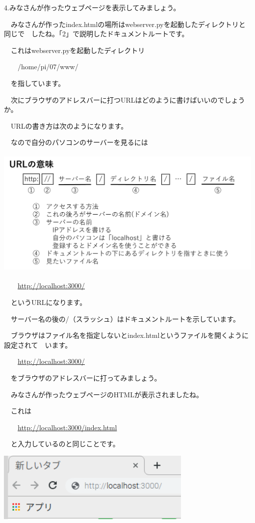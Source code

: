 \documentclass[a4paper,12pt,dvipdfmx]{jarticle}
\begin{document}
\bigskip

4.みなさんが作ったウェブページを表示してみましょう。

\ \ みなさんが作ったindex.htmlの場所はwebserver.pyを起動したディレクトリと同じで\ \ したね。「2」で説明したドキュメントルートです。

\ \ これはwebserver.pyを起動したディレクトリ

\ \ 　/home/pi/07/www/

\ \ を指しています。


\bigskip

\ \ 次にブラウザのアドレスバーに打つURLはどのように書けばいいのでしょうか。

\ \ URLの書き方は次のようになります。

\ \ なので自分のパソコンのサーバーを見るには

\centering
\includegraphics[width=13.894cm,height=6.346cm]{ome7-img040.png}
\flushleft

\ \ 　\url{http://localhost:3000/}

\ \ というURLになります。

\ \ サーバー名の後の/（スラッシュ）はドキュメントルートを示しています。

\ \ ブラウザはファイル名を指定しないとindex.htmlというファイルを開くように設定されて\ \ います。

\ \ 　\url{http://localhost:3000/}

\ \ をブラウザのアドレスバーに打ってみましょう。

\ \ みなさんが作ったウェブページのHTMLが表示されましたね。

\ \ これは

\ \ 　\url{http://localhost:3000/index.html}

\ \ と入力しているのと同じことです。



\centering
\includegraphics[width=9.551cm,height=3.427cm]{ome7-img041.png}
\flushleft
\end{document}

